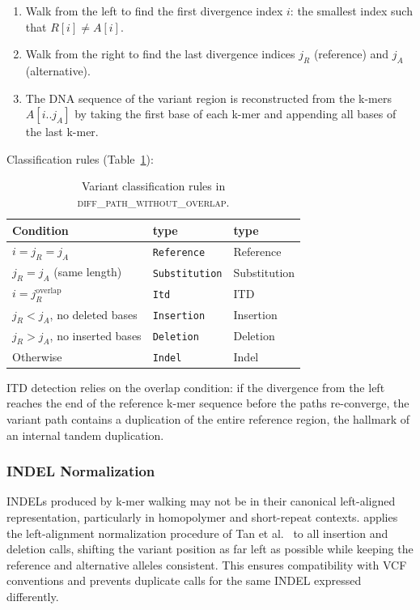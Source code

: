 \begin{enumerate}
  \item Walk from the left to find the first divergence index $i$: the smallest
        index such that $R[i] \neq A[i]$.
  \item Walk from the right to find the last divergence indices $j_R$
        (reference) and $j_A$ (alternative).
  \item The DNA sequence of the variant region is reconstructed from the k-mers
        $A[i..j_A]$ by taking the first base of each k-mer and appending all
        bases of the last k-mer.
\end{enumerate}

Classification rules (Table~\ref{tab:classification}):

\begin{table}[h]
  \centering
  \caption{Variant classification rules in \textsc{diff\_path\_without\_overlap}.}
  \label{tab:classification}
  \begin{tabular}{lll}
    \toprule
    Condition & \kmerdet{} type & \km{} type \\
    \midrule
    $i = j_R = j_A$ & \texttt{Reference} & Reference \\
    $j_R = j_A$ (same length) & \texttt{Substitution} & Substitution \\
    $i = j_R^{\text{overlap}}$ & \texttt{Itd} & ITD \\
    $j_R < j_A$, no deleted bases & \texttt{Insertion} & Insertion \\
    $j_R > j_A$, no inserted bases & \texttt{Deletion} & Deletion \\
    Otherwise & \texttt{Indel} & Indel \\
    \bottomrule
  \end{tabular}
\end{table}

ITD detection relies on the overlap condition: if the divergence from the left
reaches the end of the reference k-mer sequence before the paths re-converge,
the variant path contains a duplication of the entire reference region, the
hallmark of an internal tandem duplication.

\subsubsection{INDEL Normalization}

INDELs produced by k-mer walking may not be in their canonical left-aligned
representation, particularly in homopolymer and short-repeat contexts.
\kmerdet{} applies the left-alignment normalization procedure of Tan et
al.~\cite{tan2015unified} to all insertion and deletion calls, shifting the
variant position as far left as possible while keeping the reference and
alternative alleles consistent.  This ensures compatibility with VCF conventions
and prevents duplicate calls for the same INDEL expressed differently.

